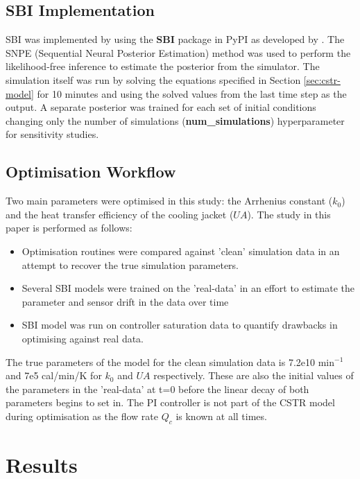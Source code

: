 \documentclass{article}
\begin{document}
\subsection{SBI Implementation}

SBI was implemented by using the \textbf{SBI} package in PyPI	as developed by \cite{tejero-cantero2020sbi}. The SNPE (Sequential Neural Posterior Estimation) method was used to perform the likelihood-free inference to estimate the posterior from the simulator. The simulation itself was run by solving the equations specified in Section \ref{sec:cstr-model} for 10 minutes and using the solved values from the last time step as the output. A separate posterior was trained for each set of initial conditions changing only the number of simulations (\textbf{num\_simulations}) hyperparameter for sensitivity studies.

\subsection{Optimisation Workflow}

Two main parameters were optimised in this study: the Arrhenius constant ($k_0$) and the heat transfer efficiency of the cooling jacket ($UA$). The study in this paper is performed as follows:
\begin{itemize}
	\item Optimisation routines were compared against 'clean' simulation data in an attempt to recover the true simulation parameters.
	\item Several SBI models were trained on the 'real-data' in an effort to estimate the parameter and sensor drift in the data over time
	\item SBI model was run on controller saturation data to quantify drawbacks in optimising against real data.
\end{itemize}

The true parameters of the model for the clean simulation data is 7.2e10 min$^{-1}$ and 7e5 cal/min/K for $k_0$ and $UA$ respectively. These are also the initial values of the parameters in the 'real-data' at t=0 before the linear decay of both parameters begins to set in. The PI controller is not part of the CSTR model during optimisation as the flow rate $Q_c$ is known at all times. 


\section{Results}
\end{document}
